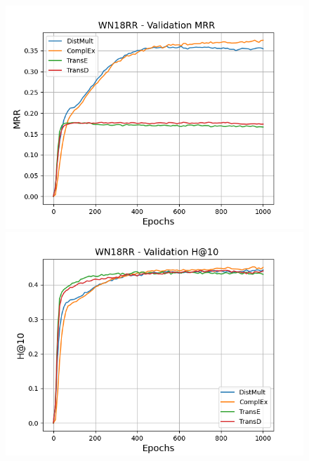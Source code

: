 \begin{figure}[H]
    \centering
    \begin{minipage}{.3\textwidth}
      \centering
      \includegraphics[width=\linewidth]{figures/results/pretrain/wn18rr/pretrain_wn18rr_mrrs.png}
    \end{minipage}%
    \begin{minipage}{.3\textwidth}
      \centering
      \includegraphics[width=\linewidth]{figures/results/pretrain/wn18rr/pretrain_wn18rr_hit10.png}
    \end{minipage}
    \begin{minipage}{.3\textwidth}
      \centering

\end{minipage}
\end{figure}
